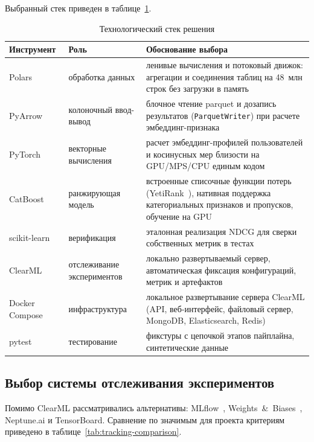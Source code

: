 Выбранный стек приведен в таблице~\ref{tab:stack}.

\begin{table}[H]
\centering
\caption{Технологический стек решения}
\label{tab:stack}
\small
\begin{tabularx}{\textwidth}{@{}l l X@{}}
\toprule
\textbf{Инструмент} & \textbf{Роль} & \textbf{Обоснование выбора} \\
\midrule
Polars~\cite{polars-docs} & обработка данных & ленивые вычисления и потоковый движок: агрегации и соединения таблиц на 48~млн строк без загрузки в память \\
PyArrow~\cite{pyarrow-docs} & колоночный ввод-вывод & блочное чтение parquet и дозапись результатов (\texttt{ParquetWriter}) при расчете эмбеддинг-признака \\
PyTorch~\cite{pytorch-docs} & векторные вычисления & расчет эмбеддинг-профилей пользователей и косинусных мер близости на GPU/MPS/CPU единым кодом \\
CatBoost~\cite{catboost-docs} & ранжирующая модель & встроенные списочные функции потерь (YetiRank~\cite{yetirank}), нативная поддержка категориальных признаков и пропусков, обучение на GPU \\
scikit-learn~\cite{sklearn-docs} & верификация & эталонная реализация NDCG для сверки собственных метрик в тестах \\
ClearML~\cite{clearml-docs} & отслеживание экспериментов & локально развертываемый сервер, автоматическая фиксация конфигураций, метрик и артефактов \\
Docker Compose~\cite{docker-docs} & инфраструктура & локальное развертывание сервера ClearML (API, веб-интерфейс, файловый сервер, MongoDB, Elasticsearch, Redis) \\
pytest~\cite{pytest-docs} & тестирование & фикстуры с цепочкой этапов пайплайна, синтетические данные \\
\bottomrule
\end{tabularx}
\end{table}

\subsection{Выбор системы отслеживания экспериментов}

Помимо ClearML рассматривались альтернативы: MLflow~\cite{mlflow-docs}, Weights~\&~Biases~\cite{wandb-docs}, Neptune.ai и TensorBoard.
Сравнение по значимым для проекта критериям приведено в таблице~\ref{tab:tracking-comparison}.

